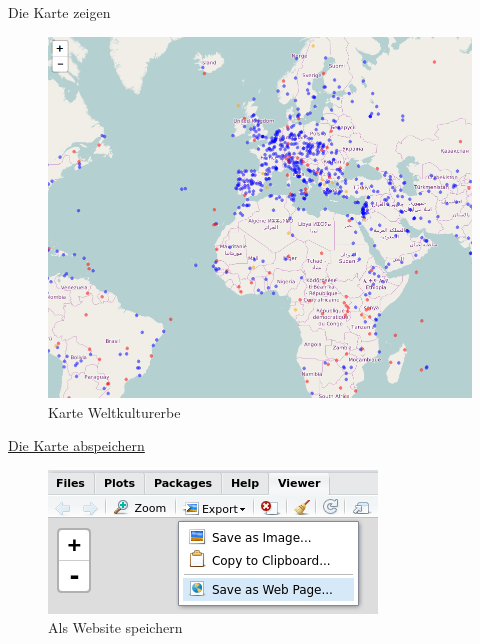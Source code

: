 \documentclass[ignorenonframetext,]{beamer}
\begin{document}
\begin{frame}{Die Karte zeigen}

\begin{figure}
\centering
\includegraphics{figure/WHCcircles.PNG}
\caption{Karte Weltkulturerbe}
\end{figure}

\end{frame}

\begin{frame}{\href{http://www.r-bloggers.com/interactive-mapping-with-leaflet-in-r-2/}{Die
Karte abspeichern}}

\begin{figure}
\centering
\includegraphics{figure/snapshot2.png}
\caption{Als Website speichern}
\end{figure}

\end{frame}
\end{document}
